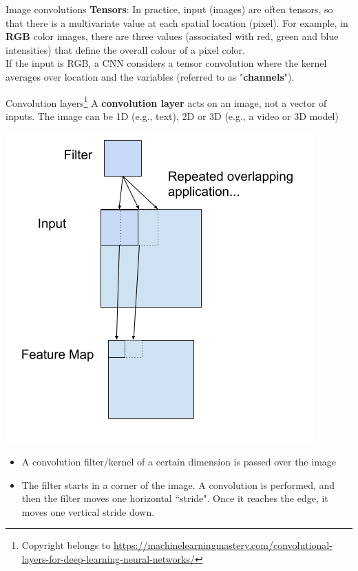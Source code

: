 \documentclass{beamer}
\begin{document}
\begin{frame}{Image convolutions}
\textbf{Tensors}: In practice, input (images) are often tensors, so that there is a multivariate value at each spatial location (pixel). For example, in \textbf{RGB} color images, there are three values (associated with red, green and blue intensities) that define the overall colour of a pixel color.\\
If the input is RGB, a CNN considers a tensor convolution where the kernel averages  over location and the variables (referred to as "\textbf{channels}").
\end{frame}


\begin{frame}{Convolution layers\footnote{Copyright belongs to \url{https://machinelearningmastery.com/convolutional-layers-for-deep-learning-neural-networks/}}}
A \textbf{convolution layer} acts on an image, not a vector of inputs. The image can be 1D (e.g., text), 2D or 3D (e.g., a video or 3D model)
\begin{minipage}{0.49\linewidth}
\includegraphics[width=\textwidth]{Images/cfilter.png}
\end{minipage}
\begin{minipage}{0.49\linewidth}
\begin{itemize}
\item A convolution filter/kernel of a certain dimension is passed over the image
\item The filter starts in a corner of the image. A convolution is performed, and then the filter moves one horizontal ``stride". Once it reaches the edge, it moves one vertical stride down. 
\end{itemize}
\end{minipage}
\end{frame}
\end{document}
